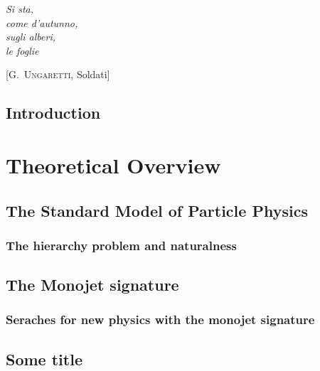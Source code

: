 \documentclass[10pt,twoside,cucitura,classica,english,openany]{toptesi}
\begin{document}




\english

\cleardoublepage

\frontespizio
\paginavuota
\begin{dedica}
\end{dedica}

\ringraziamenti

\tablespagetrue\figurespagetrue \indici

\begin{citazioni}
  \textit{Si sta,\\come d'autunno,\\sugli alberi,\\le foglie }

  [\textsc{G.~Ungaretti}, Soldati]
\end{citazioni}


\chapter*{Introduction}
\label{cha:intro}


\part{Theoretical Overview}

\mainmatter

\chapter{The Standard Model of Particle Physics}
\label{cha:SM}


\section{The hierarchy problem and naturalness}
\label{sec:hier-probl-natur}



\chapter{The Monojet signature}
\label{cha:monojet-signature}



\section{Seraches for new physics with the monojet signature}
\label{sec:seraches-new-physics}


\begin{appendices}
  \chapter{Some title}
\end{appendices}

 \printbibliography
\end{document}
